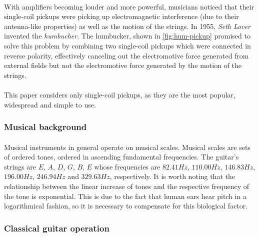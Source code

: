 \documentclass{article}
\begin{document}
\paragraph*{}
With amplifiers becoming louder and more powerful, musicians noticed that their
single-coil pickups were picking up electromagnetic interference (due to their
antenna-like properties) as well as the motion of the strings. In 1955,
\textit{Seth Lover} invented the \textit{humbucher}. The humbucker, shown in
\ref{fig:hum-pickup} promised to solve this problem by combining two
single-coil pickups which were connected in reverse polarity, effectively
canceling out the electromotive force generated from external fields but not
the electromotive force generated by the motion of the strings.

\paragraph*{}
This paper considers only single-coil pickups, as they are the most popular,
widespread and simple to use.

\subsubsection{Musical background}

\paragraph*{}
Musical instruments in general operate on musical scales. Musical scales are 
sets of ordered tones, ordered in ascending fundamental frequencies. The 
guitar's strings are $E$, $A$, $D$, $G$, $B$, $E$ whose frequencies are 
$82.41\si{Hz}$, $110.00\si{Hz}$, $146.83\si{Hz}$, $196.00\si{Hz}$, 
$246.94\si{Hz}$ and $329.63\si{Hz}$, respectively. It is worth noting that the 
relationship between the linear increase of tones and the respective frequency 
of the tone is exponential. This is due to the fact that human ears hear pitch 
in a logarithmical fashion, so it is necessary to compensate for this 
biological factor.

\subsubsection{Classical guitar operation}
\end{document}
